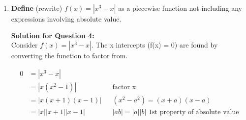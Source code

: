 \documentclass[12pt]{book}
\begin{document}
\begin{enumerate}
\vspace{1em}
\begin{proof}
    \textbf{Check answer by solving for c with (2) and then confirming result with (1)}
    \begin{align*}
        10 - b & = c && \text{From (3)} \\
        c & = 10 - 4.55 && \text{substitute b for 4.55} \\
        c & = 5.45
    \end{align*}

    \begin{center}
        Now substitute b and c values into (1) to prove the equivalent values
    \end{center}

    \vspace{-1em}
    \begin{align*}
        c^2 & = b^2 + 9 && \text{From (1)}\\
        {(5.45)}^2 & = {(4.55)}^2 + 9 && \text{substitute the values of b and c} \\
        29.7025 & = 20.7025 + 9 && \text{expand and simplify} \\
        29.7025 & = 29.7025 \\
        \text{LHS} & = \text{RHS} && \qedhere
    \end{align*}
        
\end{proof}

\newpage

\item \textbf{Define} (rewrite) $f(x) = |x^3 - x|$ as a piecewise function not including any expressions involving absolute value.

\vspace{0.3cm} 
\textbf{Solution for Question 4:}\\

Consider $f(x) = |x^3-x|$. The x intercepts (f(x) = 0) are found by converting the function to factor from.

\begin{align*}
    0 &= |x^3-x| \\
    &= |x(x^2-1)| && \text{factor x}\\
    &= |x(x+1)(x-1)| && (x^2-a^2) = (x+a)(x-a)\\
    &= |x||x+1||x-1| && |ab| = |a||b| \text{ 1st property of absolute value}\\
\end{align*}


\end{enumerate}
\end{document}
